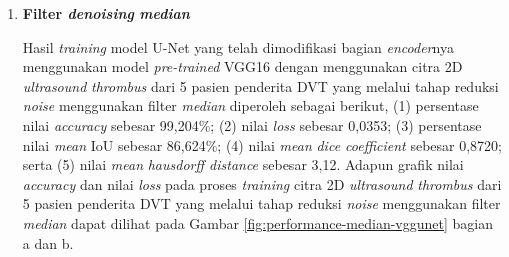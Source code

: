 \begin{enumerate}
	\item \textbf{Filter \textit{denoising} \textit{median}}
	
	Hasil \textit{training} model U-Net yang telah dimodifikasi bagian \textit{encoder}nya menggunakan model \textit{pre-trained} VGG16 dengan menggunakan citra 2D \textit{ultrasound} \textit{thrombus} dari 5 pasien penderita DVT yang melalui tahap reduksi \textit{noise} menggunakan filter \textit{median} diperoleh sebagai berikut, (1) persentase nilai \textit{accuracy} sebesar 99,204\%; (2) nilai \textit{loss} sebesar 0,0353; (3) persentase nilai \textit{mean} IoU sebesar 86,624\%; (4) nilai \textit{mean} \textit{dice coefficient} sebesar 0,8720; serta (5) nilai \textit{mean} \textit{hausdorff distance} sebesar 3,12. Adapun grafik nilai \textit{accuracy} dan nilai \textit{loss} pada proses \textit{training} citra 2D \textit{ultrasound} \textit{thrombus} dari 5 pasien penderita DVT yang melalui tahap reduksi \textit{noise} menggunakan filter \textit{median} dapat dilihat pada Gambar \ref{fig:performance-median-vggunet} bagian a dan b.
	

\end{enumerate}
